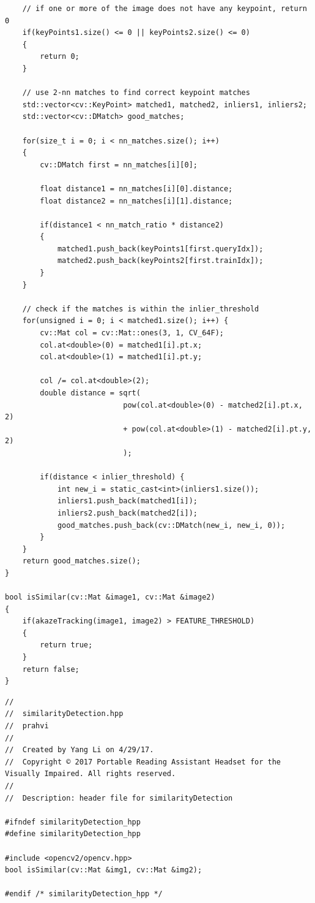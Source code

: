 \begin{lstlisting}
	// if one or more of the image does not have any keypoint, return 0
	if(keyPoints1.size() <= 0 || keyPoints2.size() <= 0)
	{
		return 0;
	}
	
	// use 2-nn matches to find correct keypoint matches
	std::vector<cv::KeyPoint> matched1, matched2, inliers1, inliers2;
	std::vector<cv::DMatch> good_matches;
	
	for(size_t i = 0; i < nn_matches.size(); i++)
	{
		cv::DMatch first = nn_matches[i][0];
		
		float distance1 = nn_matches[i][0].distance;
		float distance2 = nn_matches[i][1].distance;
		
		if(distance1 < nn_match_ratio * distance2)
		{
			matched1.push_back(keyPoints1[first.queryIdx]);
			matched2.push_back(keyPoints2[first.trainIdx]);
		}
	}
	
	// check if the matches is within the inlier_threshold
	for(unsigned i = 0; i < matched1.size(); i++) {
		cv::Mat col = cv::Mat::ones(3, 1, CV_64F);
		col.at<double>(0) = matched1[i].pt.x;
		col.at<double>(1) = matched1[i].pt.y;
		
		col /= col.at<double>(2);
		double distance = sqrt(
						   pow(col.at<double>(0) - matched2[i].pt.x, 2)
						   + pow(col.at<double>(1) - matched2[i].pt.y, 2)
						   );
		
		if(distance < inlier_threshold) {
			int new_i = static_cast<int>(inliers1.size());
			inliers1.push_back(matched1[i]);
			inliers2.push_back(matched2[i]);
			good_matches.push_back(cv::DMatch(new_i, new_i, 0));
		}
	}
	return good_matches.size();
}

bool isSimilar(cv::Mat &image1, cv::Mat &image2)
{
	if(akazeTracking(image1, image2) > FEATURE_THRESHOLD)
	{
		return true;
	}
	return false;
}

\end{lstlisting}

\begin{lstlisting}
//
//  similarityDetection.hpp
//  prahvi
//
//  Created by Yang Li on 4/29/17.
//  Copyright © 2017 Portable Reading Assistant Headset for the Visually Impaired. All rights reserved.
//
//	Description: header file for similarityDetection

#ifndef similarityDetection_hpp
#define similarityDetection_hpp

#include <opencv2/opencv.hpp>
bool isSimilar(cv::Mat &img1, cv::Mat &img2);

#endif /* similarityDetection_hpp */

\end{lstlisting}

